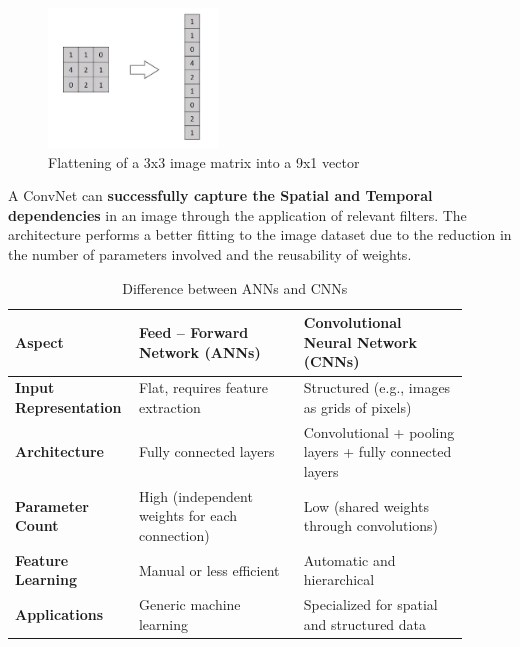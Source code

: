 \newpage
\begin{figure}[h!]
    \centering
    \includegraphics[width=0.4\textwidth]{images/figure2.png}
    \caption{Flattening of a 3x3 image matrix into a 9x1 vector}
    \label{fig:2}
\end{figure}

A ConvNet can \textbf{successfully capture the Spatial and Temporal dependencies} in an image through the application of relevant filters. The architecture performs a better fitting to the image dataset due to the reduction in the number of parameters involved and the reusability of weights.

\begin{table}[h!]
\centering
\begin{tabular}{|p{0.2\linewidth}|p{0.35\linewidth}|p{0.35\linewidth}|} 
  \hline
  \rowcolor{lightgray} \textbf{Aspect} & \textbf{Feed – Forward Network (ANNs)} & \textbf{Convolutional Neural Network (CNNs)} \\ 
  \hline\hline
  \textbf{Input Representation} & Flat, requires feature extraction & Structured (e.g., images as grids of pixels) \\ 
  \hline
  \textbf{Architecture} & Fully connected layers & Convolutional + pooling layers + fully connected layers \\ 
  \hline
  \textbf{Parameter Count} & High (independent weights for each connection) & Low (shared weights through convolutions) \\
  \hline
  \textbf{Feature Learning} & Manual or less efficient & Automatic and hierarchical \\
  \hline
  \textbf{Applications} & Generic machine learning & Specialized for spatial and structured data \\
  \hline
\end{tabular}
\caption{Difference between ANNs and CNNs}
\label{table:1}
\end{table}

